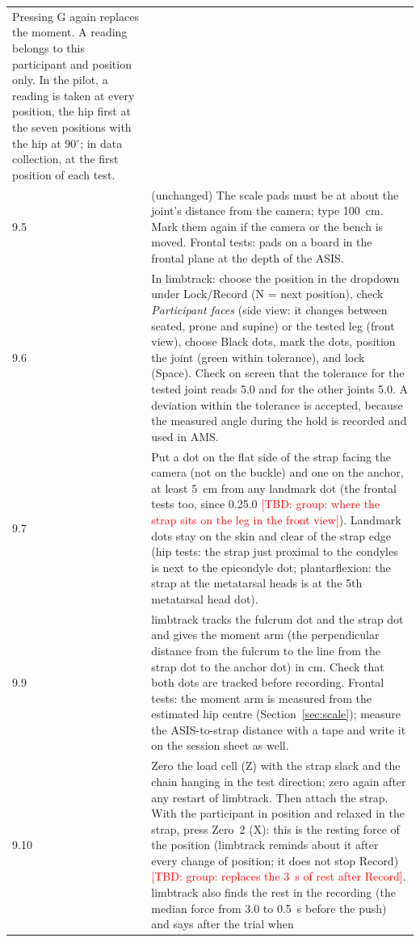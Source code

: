 \documentclass[a4paper,10pt]{article}
\newcommand{\lt}{\textsf{limbtrack}}
\newcommand{\dg}{\ensuremath{^\circ}}
\newcommand{\tbd}[1]{\textcolor{red}{[TBD: #1]}}
\begin{document}
\begin{longtable}{@{}P{2.2cm}p{14.3cm}@{}}
  Pressing G again replaces the moment. A reading belongs to this participant and position only. In the pilot, a reading is taken at every
  position, the hip first at the seven positions with the hip at 90\dg; in data collection, at the first position of each test. \\
9.5 & (unchanged) The scale pads must be at about the joint's distance from the camera; type 100~cm. Mark them again if the camera or the
  bench is moved. Frontal tests: pads on a board in the frontal plane at the depth of the ASIS. \\
9.6 & In \lt{}: choose the position in the dropdown under Lock/Record (N = next position), check \emph{Participant faces} (side view: it
  changes between seated, prone and supine) or the tested leg (front view), choose Black dots, mark the dots, position the joint (green
  within tolerance), and lock (Space). Check on screen that the tolerance for the tested joint reads 5.0 and for the other joints 5.0. A
  deviation within the tolerance is accepted, because the measured angle during the hold is recorded and used in AMS. \\
9.7 & Put a dot on the flat side of the strap facing the camera (not on the buckle) and one on the anchor, at least
  5~cm from any landmark dot (the frontal tests too, since 0.25.0 \tbd{group: where the strap sits on the leg in the front view}). Landmark dots stay on the skin and clear of the strap edge (hip tests: the strap just proximal to the
  condyles is next to the epicondyle dot; plantarflexion: the strap at the metatarsal heads is at the 5th metatarsal head dot). \\
9.9 & \lt{} tracks the fulcrum dot and the strap dot and gives the moment arm (the perpendicular distance from the fulcrum to the line
  from the strap dot to the anchor dot) in cm. Check that both dots are tracked before recording. Frontal tests: the moment arm is
  measured from the estimated hip centre (Section~\ref{sec:scale}); measure the ASIS-to-strap distance with a tape and write it on the
  session sheet as well. \\
9.10 & Zero the load cell (Z) with the strap slack and the chain hanging in the test direction; zero again after any restart of \lt{}.
  Then attach the strap. With the participant in position and relaxed in the strap, press Zero~2 (X): this is the resting force of the
  position (\lt{} reminds about it after every change of position; it does not stop Record) \tbd{group: replaces the 3~s of rest after
  Record}. \lt{} also finds the rest in the recording (the median force from 3.0 to 0.5~s before the push) and says after the trial when

\end{longtable}
\end{document}
